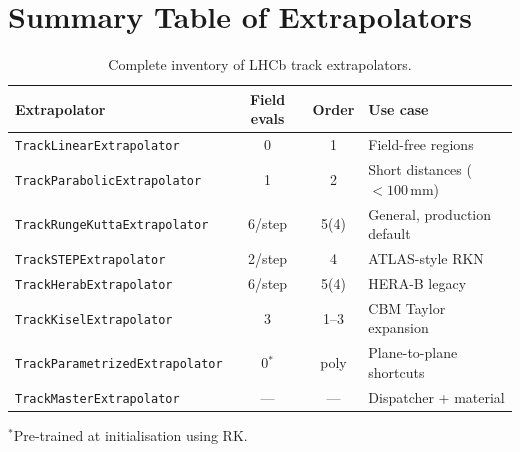 \documentclass[11pt,a4paper]{article}
\begin{document}
\section{Summary Table of Extrapolators}\label{sec:summary}

\begin{table}[H]
\centering
\caption{Complete inventory of LHCb track extrapolators.}
\footnotesize
\begin{tabular}{@{}lccl@{}}
\toprule
\textbf{Extrapolator} & \textbf{Field evals} & \textbf{Order} & \textbf{Use case} \\
\midrule
\texttt{TrackLinearExtrapolator}       & 0      & 1    & Field-free regions \\
\texttt{TrackParabolicExtrapolator}    & 1      & 2    & Short distances ($<100$\,mm) \\
\texttt{TrackRungeKuttaExtrapolator}   & 6/step & 5(4) & General, production default \\
\texttt{TrackSTEPExtrapolator}         & 2/step & 4    & ATLAS-style RKN \\
\texttt{TrackHerabExtrapolator}        & 6/step & 5(4) & HERA-B legacy \\
\texttt{TrackKiselExtrapolator}        & 3      & 1--3 & CBM Taylor expansion \\
\texttt{TrackParametrizedExtrapolator} & 0$^*$  & poly & Plane-to-plane shortcuts \\
\texttt{TrackMasterExtrapolator}       & ---    & ---  & Dispatcher + material \\
\bottomrule
\end{tabular}
\begin{flushleft}
\footnotesize $^*$Pre-trained at initialisation using RK.
\end{flushleft}
\end{table}
\end{document}
